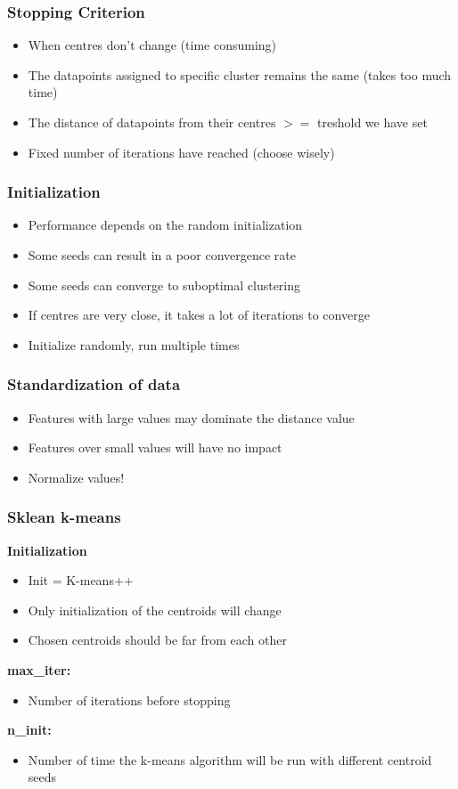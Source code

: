 \subsubsection{Stopping Criterion}
\begin{itemize}
    \item When centres don't change (time consuming)
    \item The datapoints assigned to specific cluster remains the same (takes too much time)
    \item The distance of datapoints from their centres $>=$ treshold we have set
    \item Fixed number of iterations have reached (choose wisely)
\end{itemize}

\subsubsection{Initialization}
\begin{itemize}
    \item Performance depends on the random initialization
    \item Some seeds can result in a poor convergence rate
    \item Some seeds can converge to suboptimal clustering
    \item If centres are very close, it takes a lot of iterations to converge
    \item Initialize randomly, run multiple times
\end{itemize}

\subsubsection{Standardization of data}
\begin{itemize}
    \item Features with large values may dominate the distance value
    \item Features over small values will have no impact
    \item Normalize values!
\end{itemize}

\subsubsection{Sklean k-means}
\textbf{Initialization}
\begin{itemize}
    \item Init = K-means++
    \item Only initialization of the centroids will change
    \item Chosen centroids should be far from each other
\end{itemize}
\textbf{max\_iter:}
\begin{itemize}
    \item Number of iterations before stopping
\end{itemize}
\textbf{n\_init:}
\begin{itemize}
    \item Number of time the k-means algorithm will be run with different centroid seeds
\end{itemize}

